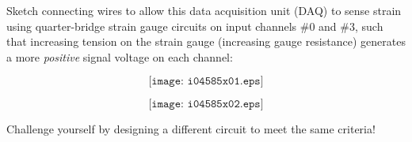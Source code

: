 

Sketch connecting wires to allow this data acquisition unit (DAQ) to sense strain using quarter-bridge strain gauge circuits on input channels \#0 and \#3, such that increasing tension on the strain gauge (increasing gauge resistance) generates a more {\it positive} signal voltage on each channel:

$$\texttt{[image: i04585x01.eps]}$$







$$\texttt{[image: i04585x02.eps]}$$

Challenge yourself by designing a different circuit to meet the same criteria! 










